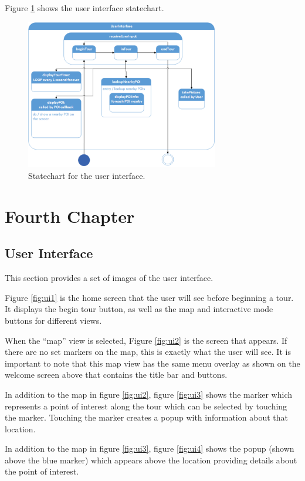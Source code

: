 \documentclass[11pt]{report}
\begin{document}
Figure \ref{fig:user_interface_statechart} shows the user interface statechart.
\begin{figure}[H]
 \centering
 \includegraphics[width=0.75\textwidth]{user_interface_statechart.pdf}
 \caption{Statechart for the user interface.}
 \label{fig:user_interface_statechart}
\end{figure}

\chapter{Fourth Chapter}
\section{User Interface}
This section provides a set of images of the user interface.

Figure \ref{fig:ui1} is the home screen that the user will see before beginning a tour. It displays the begin tour button, as well as the map and interactive mode buttons for different views.

When the “map” view is selected, Figure \ref{fig:ui2} is the screen that appears. If there are no set markers on the map, this is exactly what the user will see. It is important to note that 
this map view has the same menu overlay as shown on the welcome screen above that contains the title bar and buttons.

In addition to the map in figure \ref{fig:ui2}, figure \ref{fig:ui3} shows the marker which represents a point of interest along the tour which can be selected by touching the marker. Touching the marker creates a popup with information about that location.

In addition to the map in figure \ref{fig:ui3}, figure \ref{fig:ui4} shows the popup (shown above the blue marker) which appears above the location providing details about the point of interest.
\end{document}
